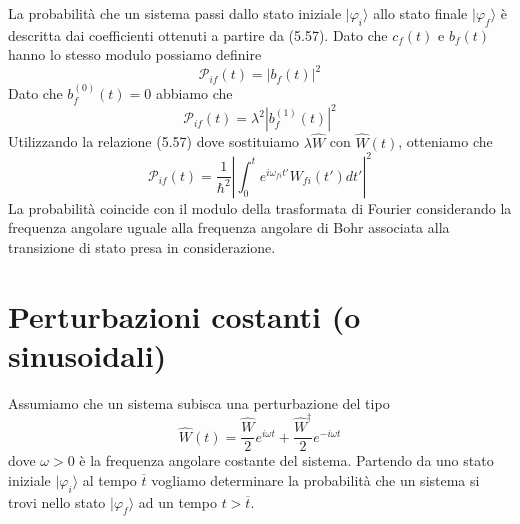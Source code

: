 La probabilit\`a che un sistema passi dallo stato iniziale $|\varphi_i \rangle$ allo stato finale $|\varphi_f \rangle$ \`e descritta dai coefficienti ottenuti a partire da (5.57). Dato che $c_f(t)$ e $b_f(t)$ hanno lo stesso modulo possiamo definire 
\begin{equation*}
	\mathcal{P}_{if}(t) = |b_f(t)|^2
\end{equation*}
Dato che $b_{f}^{(0)}(t) = 0$ abbiamo che 
\begin{equation*}
	\mathcal{P}_{if}(t) = \lambda^2|b_{f}^{(1)}(t)|^2
\end{equation*}
Utilizzando la relazione (5.57) dove sostituiamo $\lambda \hat{W}$ con $\hat{W}(t)$, otteniamo che
\begin{equation}
	\mathcal{P}_{if}(t) = \frac{1}{\hbar^2} \left | \int_0^t e^{i\omega_{fi}t'}W_{fi}(t')dt' \right|^2
\end{equation}
La probabilit\`a coincide con il modulo della trasformata di Fourier considerando la frequenza angolare uguale alla frequenza angolare di Bohr associata alla transizione di stato presa in considerazione.
\newpage
\section{Perturbazioni costanti (o sinusoidali)}

Assumiamo che un sistema subisca una perturbazione del tipo 
\begin{equation*}
	\hat{W}(t) = \frac{\hat{W}}{2}e^{i\omega t}+ \frac{\hat{W}^{\dag}}{2}e^{-i \omega t}
\end{equation*}
dove $\omega >0 $ \`e la frequenza angolare costante del sistema. Partendo da uno stato iniziale $|\varphi_i \rangle$ al tempo $\overline{t}$ vogliamo determinare la probabilit\`a che un sistema si trovi nello stato $|\varphi_f \rangle $ ad un tempo $t > \overline{t}$.


